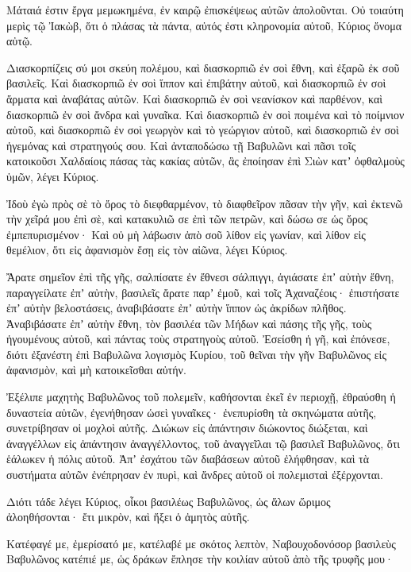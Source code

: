 {Μάταιά ἐστιν ἔργα μεμωκημένα, ἐν καιρῷ ἐπισκέψεως αὐτῶν ἀπολοῦνται.
Οὐ τοιαύτη μερὶς τῷ Ἰακὼβ, ὅτι ὁ πλάσας τὰ πάντα, αὐτός ἐστι κληρονομία αὐτοῦ, Κύριος ὄνομα αὐτῷ.
\par }{\PP {}Διασκορπίζεις σύ μοι σκεύη πολέμου, καὶ διασκορπιῶ ἐν σοὶ ἔθνη, καὶ ἐξαρῶ ἐκ σοῦ βασιλεῖς.
Καὶ διασκορπιῶ ἐν σοὶ ἵππον καὶ ἐπιβάτην αὐτοῦ, καὶ διασκορπιῶ ἐν σοὶ ἅρματα καὶ ἀναβάτας αὐτῶν.
Καὶ διασκορπιῶ ἐν σοὶ νεανίσκον καὶ παρθένον, καὶ διασκορπιῶ ἐν σοὶ ἄνδρα καὶ γυναῖκα.
Καὶ διασκορπιῶ ἐν σοὶ ποιμένα καὶ τὸ ποίμνιον αὐτοῦ, καὶ διασκορπιῶ ἐν σοὶ γεωργὸν καὶ τὸ γεώργιον αὐτοῦ, καὶ διασκορπιῶ ἐν σοὶ ἡγεμόνας καὶ στρατηγούς σου.
Καὶ ἀνταποδώσω τῇ Βαβυλῶνι καὶ πᾶσι τοῖς κατοικοῦσι Χαλδαίοις πάσας τὰς κακίας αὐτῶν, ἃς ἐποίησαν ἐπὶ Σιὼν κατʼ ὀφθαλμοὺς ὑμῶν, λέγει Κύριος.
\par }{\PP {}Ἰδοὺ ἐγὼ πρὸς σὲ τὸ ὄρος τὸ διεφθαρμένον, τὸ διαφθεῖρον πᾶσαν τὴν γῆν, καὶ ἐκτενῶ τὴν χεῖρά μου ἐπὶ σὲ, καὶ κατακυλιῶ σε ἐπὶ τῶν πετρῶν, καὶ δώσω σε ὡς ὄρος ἐμπεπυρισμένον·
Καὶ οὐ μὴ λάβωσιν ἀπὸ σοῦ λίθον εἰς γωνίαν, καὶ λίθον εἰς θεμέλιον, ὅτι εἰς ἀφανισμὸν ἔσῃ εἰς τὸν αἰῶνα, λέγει Κύριος.
\par }{\PP {}Ἄρατε σημεῖον ἐπὶ τῆς γῆς, σαλπίσατε ἐν ἔθνεσι σάλπιγγι, ἁγιάσατε ἐπʼ αὐτὴν ἔθνη, παραγγείλατε ἐπʼ αὐτὴν, βασιλεῖς ἄρατε παρʼ ἐμοῦ, καὶ τοῖς Ἀχαναζέοις· ἐπιστήσατε ἐπʼ αὐτὴν βελοστάσεις, ἀναβιβάσατε ἐπʼ αὐτὴν ἵππον ὡς ἀκρίδων πλῆθος.
Ἀναβιβάσατε ἐπʼ αὐτὴν ἔθνη, τὸν βασιλέα τῶν Μήδων καὶ πάσης τῆς γῆς, τοὺς ἡγουμένους αὐτοῦ, καὶ πάντας τοὺς στρατηγοὺς αὐτοῦ.
Ἐσείσθη ἡ γῆ, καὶ ἐπόνεσε, διότι ἐξανέστη ἐπὶ Βαβυλῶνα λογισμὸς Κυρίου, τοῦ θεῖναι τὴν γῆν Βαβυλῶνος εἰς ἀφανισμὸν, καὶ μὴ κατοικεῖσθαι αὐτήν.
\par }{\PP {}Ἐξέλιπε μαχητὴς Βαβυλῶνος τοῦ πολεμεῖν, καθήσονται ἐκεῖ ἐν περιοχῇ, ἐθραύσθη ἡ δυναστεία αὐτῶν, ἐγενήθησαν ὡσεὶ γυναῖκες· ἐνεπυρίσθη τὰ σκηνώματα αὐτῆς, συνετρίβησαν οἱ μοχλοὶ αὐτῆς.
Διώκων εἰς ἀπάντησιν διώκοντος διώξεται, καὶ ἀναγγέλλων εἰς ἀπάντησιν ἀναγγέλλοντος, τοῦ ἀναγγεῖλαι τῷ βασιλεῖ Βαβυλῶνος, ὅτι ἑάλωκεν ἡ πόλις αὐτοῦ.
Ἀπʼ ἐσχάτου τῶν διαβάσεων αὐτοῦ ἐλήφθησαν, καὶ τὰ συστήματα αὐτῶν ἐνέπρησαν ἐν πυρὶ, καὶ ἄνδρες αὐτοῦ οἱ πολεμισταὶ ἐξέρχονται.
\par }{\PP {}Διότι τάδε λέγει Κύριος, οἶκοι βασιλέως Βαβυλῶνος, ὡς ἅλων ὥριμος ἀλοηθήσονται· ἔτι μικρὸν, καὶ ἥξει ὁ ἀμητὸς αὐτῆς.
\par }{\PP {}Κατέφαγέ με, ἐμερίσατό με, κατέλαβέ με σκότος λεπτὸν, Ναβουχοδονόσορ βασιλεὺς Βαβυλῶνος κατέπιέ με, ὡς δράκων ἔπλησε τὴν κοιλίαν αὐτοῦ ἀπὸ τῆς τρυφῆς μου·
}
